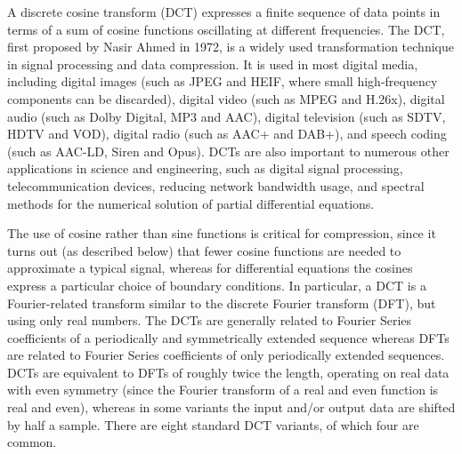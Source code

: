 \documentclass[\documentfontsize, twocolumn]{\classname}
\begin{document}
A discrete cosine transform (DCT) expresses a finite sequence of data points in terms of a sum of cosine functions oscillating at different frequencies. The DCT, first proposed by Nasir Ahmed in 1972, is a widely used transformation technique in signal processing and data compression. It is used in most digital media, including digital images (such as JPEG and HEIF, where small high-frequency components can be discarded), digital video (such as MPEG and H.26x), digital audio (such as Dolby Digital, MP3 and AAC), digital television (such as SDTV, HDTV and VOD), digital radio (such as AAC+ and DAB+), and speech coding (such as AAC-LD, Siren and Opus). DCTs are also important to numerous other applications in science and engineering, such as digital signal processing, telecommunication devices, reducing network bandwidth usage, and spectral methods for the numerical solution of partial differential equations.

The use of cosine rather than sine functions is critical for compression, since it turns out (as described below) that fewer cosine functions are needed to approximate a typical signal, whereas for differential equations the cosines express a particular choice of boundary conditions. In particular, a DCT is a Fourier-related transform similar to the discrete Fourier transform (DFT), but using only real numbers. The DCTs are generally related to Fourier Series coefficients of a periodically and symmetrically extended sequence whereas DFTs are related to Fourier Series coefficients of only periodically extended sequences. DCTs are equivalent to DFTs of roughly twice the length, operating on real data with even symmetry (since the Fourier transform of a real and even function is real and even), whereas in some variants the input and/or output data are shifted by half a sample. There are eight standard DCT variants, of which four are common\cite{bib:discreteCosineTransform}.
\end{document}
